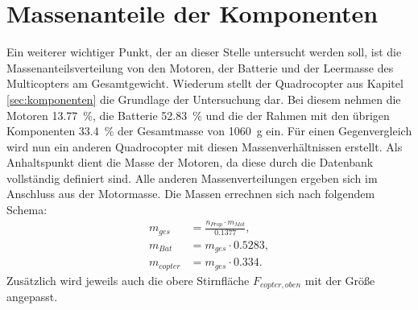 \section{Massenanteile der Komponenten}
\label{sec:massenverteilung}
Ein weiterer wichtiger Punkt, der an dieser Stelle untersucht werden soll, ist die Massenanteilsverteilung von den Motoren, der Batterie und der Leermasse des Multicopters am Gesamtgewicht. Wiederum stellt der Quadrocopter aus Kapitel \ref{sec:komponenten} die Grundlage der Untersuchung dar. Bei diesem nehmen die Motoren \SI{13,77}{\%}, die Batterie \SI{52,83}{\%} und die der Rahmen mit den übrigen Komponenten \SI{33,4}{\%} der Gesamtmasse von \SI{1060}{g} ein. Für einen Gegenvergleich wird nun ein anderen Quadrocopter mit diesen Massenverhältnissen erstellt. Als Anhaltspunkt dient die Masse der Motoren, da diese durch die Datenbank vollständig definiert sind. Alle anderen Massenverteilungen ergeben sich im Anschluss aus der Motormasse.
Die Massen errechnen sich nach folgendem Schema:
\begin{align}
	m_{ges} &= \frac{n_{Prop}\cdot m_{Mot}}{0.1377} , \\
	m_{Bat} &= m_{ges}\cdot 0.5283 , \\
	m_{copter} &= m_{ges}\cdot 0.334.
\end{align}
Zusätzlich wird jeweils auch die obere Stirnfläche \ensuremath{F_{copter,oben}} mit der Größe angepasst. 

